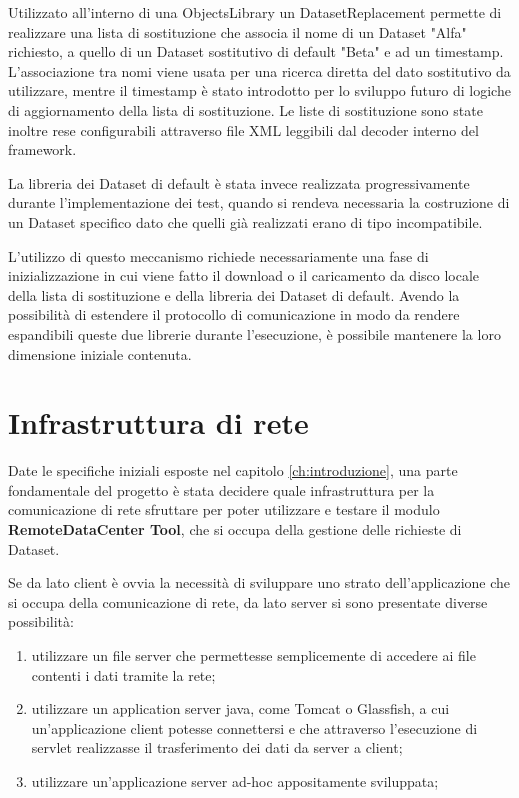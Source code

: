 Utilizzato all'interno di una ObjectsLibrary un DatasetReplacement permette di realizzare una lista di sostituzione che associa il nome di un Dataset "Alfa" richiesto, a quello di un Dataset sostitutivo di default "Beta" e ad un timestamp.
L'associazione tra nomi viene usata per una ricerca diretta del dato sostitutivo da utilizzare, mentre il timestamp è stato introdotto per lo sviluppo futuro di logiche di aggiornamento della lista di sostituzione.
Le liste di sostituzione sono state inoltre rese configurabili attraverso file XML leggibili dal decoder interno del framework.

La libreria dei Dataset di default è stata invece realizzata progressivamente durante l'implementazione dei test, quando si rendeva necessaria la costruzione di un Dataset specifico dato che quelli già realizzati erano di tipo incompatibile.

L'utilizzo di questo meccanismo richiede necessariamente una fase di inizializzazione in cui viene fatto il download o il caricamento da disco locale della lista di sostituzione e della libreria dei Dataset di default. Avendo la possibilità di estendere il protocollo di comunicazione in modo da rendere espandibili queste due librerie durante l'esecuzione, è possibile mantenere la loro dimensione iniziale contenuta.

\section{Infrastruttura di rete} 
\label{sec:rete}
Date le specifiche iniziali esposte nel capitolo \ref{ch:introduzione}, una parte fondamentale del progetto è stata decidere quale infrastruttura per la comunicazione di rete sfruttare per poter utilizzare e testare il modulo \textbf{RemoteDataCenter Tool}, che si occupa della gestione delle richieste di Dataset.


Se da lato client è ovvia la necessità di sviluppare uno strato dell'applicazione che si occupa della comunicazione di rete, da lato server si sono presentate diverse possibilità: 

\begin{enumerate}
	\item  utilizzare un file server che permettesse semplicemente di accedere ai file contenti i dati tramite la rete;
	\item  utilizzare un application server java, come Tomcat o Glassfish, a cui un'applicazione client potesse connettersi e che attraverso l'esecuzione di servlet realizzasse il trasferimento dei dati da server a client;
	\item  utilizzare un'applicazione server ad-hoc appositamente sviluppata;
\end{enumerate}

